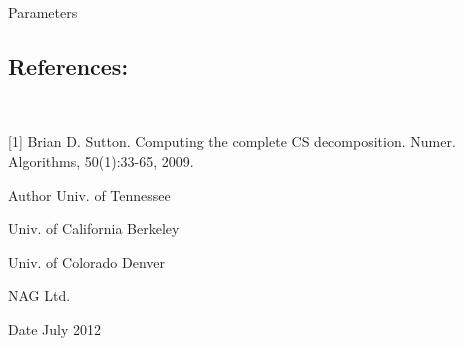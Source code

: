 \begin{DoxyParams}[1]{Parameters}
\subsection*{References\+: }\\
\hline
\end{DoxyParams}


\mbox{[}1\mbox{]} Brian D. Sutton. Computing the complete C\+S decomposition. Numer. Algorithms, 50(1)\+:33-\/65, 2009. \begin{DoxyAuthor}{Author}
Univ. of Tennessee 

Univ. of California Berkeley 

Univ. of Colorado Denver 

N\+A\+G Ltd. 
\end{DoxyAuthor}
\begin{DoxyDate}{Date}
July 2012 
\end{DoxyDate}
